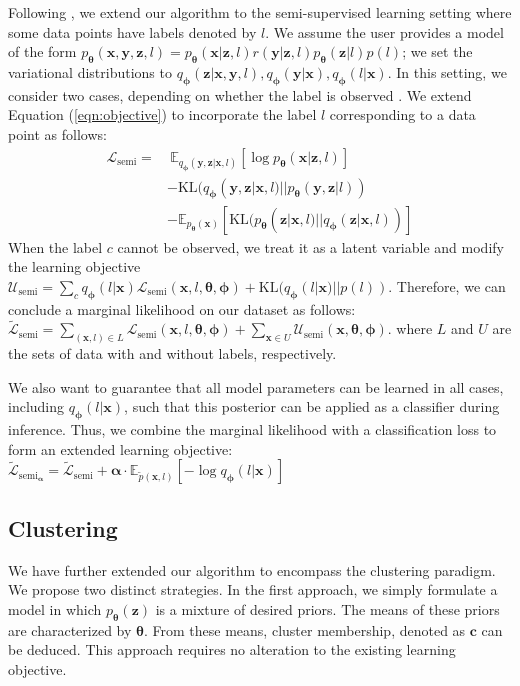 \documentclass[letterpaper]{article} %
\newcommand{\bc}{\mathbf{c}}
\newcommand{\bx}{\mathbf{x}}
\newcommand{\bz}{\mathbf{z}}
\newcommand{\by}{\mathbf{y}}
\newcommand\Exp{\mathbb{E}}
\newcommand\KL{\text{KL}}
\newcommand\Lc{\mathcal{L}}
\newcommand\Uc{\mathcal{U}}
\newcommand{\btheta}{{\boldsymbol{\theta}}}
\newcommand{\bphi}{{\boldsymbol{\phi}}}
\let\oldtheta\theta
\renewcommand{\theta}{{\boldsymbol \oldtheta}}
\let\oldphi\phi
\renewcommand{\phi}{{\boldsymbol \oldphi}}
\let\oldalpha\alpha
\renewcommand{\alpha}{{\boldsymbol \oldalpha}}
\begin{document}
Following \citet{makhzani2015adversarial}, we extend our algorithm to the semi-supervised learning setting where some data points have labels denoted by $l$. We assume the user provides a model of the form $p_\theta(\bx, \by, \bz, l) = p_\theta(\bx|\bz, l)r(\by|\bz, l)p_\theta(\bz|l)p(l)$; we set the variational distributions to $q_\phi(\bz|\bx, \by, l), q_\phi(\by|\bx), q_\phi(l|\bx)$. In this setting, we consider two cases, depending on whether the label is observed \citep{kingma2014semi}. We extend Equation (\ref{eqn:objective}) to incorporate the label $l$ corresponding to a data point as follows:
\begin{align}
    \Lc_\text{semi} =
    &~\Exp_{q_\phi(\by,\bz|\bx, l)} [\log p_\theta(\bx|\bz, l)] \\ \nonumber 
    &-\KL(q_\phi(\by,\bz|\bx, l)||p_\theta(\by,\bz|l)) \\ \nonumber
    &- \Exp_{p_\theta(\bx)} \left [ \KL(p_\theta(\bz|\bx, l)||q_\phi(\bz|\bx, l)) \right ]
\end{align}
When the label $c$ cannot be observed, we treat it as a latent variable and modify the learning objective $\Uc_\text{semi} 
    = \sum_c q_\phi(l|\bx)\Lc_\text{semi}(\bx, l, \btheta, \phi) + \KL(q_\phi(l|\bx)||p(l))$. Therefore, we can conclude a marginal likelihood on our dataset as follows:
$
    \tilde{\Lc}_\text{semi} = \sum_{(\bx, l) \in L}\Lc_\text{semi}(\bx, l, \btheta, \bphi) + \sum_{\bx \in U}\Uc_\text{semi}(\bx, \btheta, \bphi).
$
where $L$ and $U$ are the sets of data with and without labels, respectively.

We also want to guarantee that all model parameters can be learned in all cases, including $q_\phi(l|\bx)$, such that this posterior can be applied as a classifier during inference. Thus, we combine the marginal likelihood with a classification loss to form an extended learning objective:
$
    \tilde{\Lc}_{\text{semi}_\alpha} = \tilde{\Lc}_\text{semi} + \alpha \cdot \Exp_{\tilde{p}(\bx, l)} \left[ - \log q_\phi (l|\bx) \right]
$

\subsection{Clustering}
We have further extended our algorithm to encompass the clustering paradigm. We propose two distinct strategies. In the first approach, we simply formulate a model in which $p_\btheta(\bz)$ is a mixture of desired priors. The means of these priors are characterized by $\btheta$. From these means, cluster membership, denoted as $\bc$ can be deduced. This approach requires no alteration to the existing learning objective.
\end{document}
